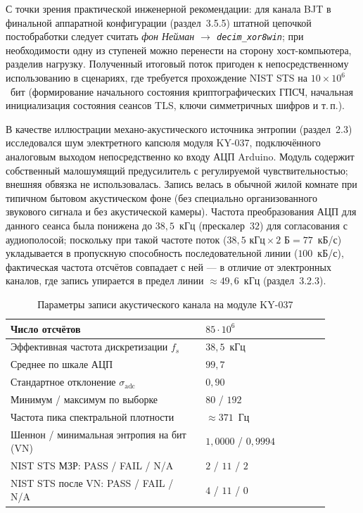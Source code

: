 С точки зрения практической инженерной рекомендации: для канала BJT в финальной
аппаратной конфигурации (раздел~3.5.5) штатной цепочкой постобработки следует
считать \emph{фон Нейман $\to$ \texttt{decim\_xor8win}}; при необходимости одну
из ступеней можно перенести на сторону хост-компьютера, разделив нагрузку.
Полученный итоговый поток пригоден к непосредственному использованию в
сценариях, где требуется прохождение NIST STS на $10\times 10^6$~бит (формирование
начального состояния криптографических ГПСЧ, начальная инициализация состояния
сеансов TLS, ключи симметричных шифров и т.\,п.).


В качестве иллюстрации механо-акустического источника энтропии (раздел~2.3)
исследовался шум электретного капсюля модуля KY-037, подключённого аналоговым
выходом непосредственно ко входу АЦП Arduino. Модуль содержит собственный
малошумящий предусилитель с регулируемой чувствительностью; внешняя обвязка
не использовалась. Запись велась в обычной жилой комнате при типичном
бытовом акустическом фоне (без специально организованного звукового сигнала
и без акустической камеры). Частота преобразования АЦП для данного сеанса была
понижена до $38{,}5$~кГц (прескалер~$32$) для согласования с аудиополосой;
поскольку при такой частоте поток ($38{,}5\text{ кГц}\times 2\text{ Б} = 77$~кБ/с)
укладывается в пропускную способность последовательной линии ($100$~кБ/с),
фактическая частота отсчётов совпадает с ней --- в отличие от электронных каналов,
где запись упирается в предел линии $\approx 49{,}6$~кГц (раздел~3.2.3).

\begin{table}[H]
  \centering
  \footnotesize
  \caption{Параметры записи акустического канала на модуле KY-037}
  \label{tab:mic_summary}
  \begin{tabular}{|p{0.55\linewidth}|p{0.35\linewidth}|}
    \hline
    Число отсчётов & $85\cdot 10^6$ \\
    \hline
    Эффективная частота дискретизации $f_s$ & $38{,}5$~кГц \\
    \hline
    Среднее по шкале АЦП & $99{,}7$ \\
    \hline
    Стандартное отклонение $\sigma_\mathrm{adc}$ & $0{,}90$ \\
    \hline
    Минимум / максимум по выборке & $80$ / $192$ \\
    \hline
    Частота пика спектральной плотности & ${\approx}371$~Гц \\
    \hline
    Шеннон / минимальная энтропия на бит (VN) & $1{,}0000$ / $0{,}9994$ \\
    \hline
    NIST STS МЗР: PASS / FAIL / N/A & $2$ / $11$ / $2$ \\
    \hline
    NIST STS после VN: PASS / FAIL / N/A & $4$ / $11$ / $0$ \\
    \hline
  \end{tabular}
\end{table}

